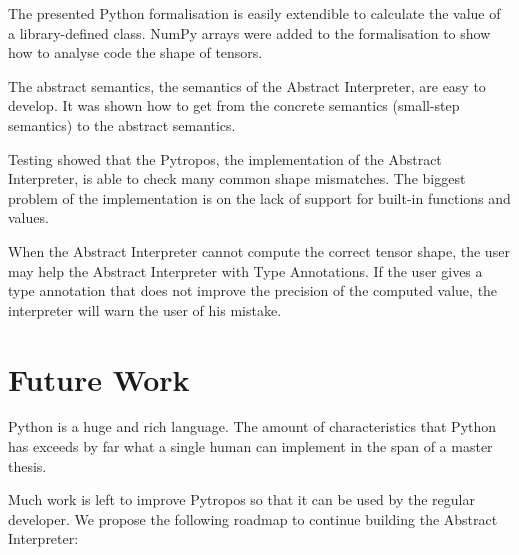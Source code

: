 The presented Python formalisation is easily extendible to calculate the value of a
library-defined class. NumPy arrays were added to the formalisation to show how to analyse
code the shape of tensors.


The abstract semantics, the semantics of the Abstract Interpreter, are easy to develop. It
was shown how to get from the concrete semantics (small-step semantics) to the abstract
semantics.

Testing showed that the Pytropos, the implementation of the Abstract Interpreter, is able
to check many common shape mismatches. The biggest problem of the implementation
is on the lack of support for built-in functions and values.

When the Abstract Interpreter cannot compute the correct tensor shape, the user may help
the Abstract Interpreter with Type Annotations. If the user gives a type annotation that
does not improve the precision of the computed value, the interpreter will warn the user
of his mistake.

\section{Future Work}\label{future-work}

Python is a huge and rich language. The amount of characteristics that Python has exceeds
by far what a single human can implement in the span of a master thesis.

Much work is left to improve Pytropos so that it can be used by the regular developer. We
propose the following roadmap to continue building the Abstract Interpreter:



